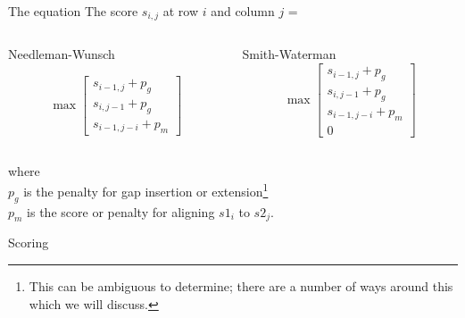 \documentclass[pdf]{beamer}
\begin{document}
  


\begin{frame}[fragile]{The equation}
  The score $s_{i,j}$ at row $i$ and column $j$ =

  \vspace{1cm}
  \begin{columns}
    \begin{column}{0.5\textwidth}
      \small{
        Needleman-Wunsch

        $$
        \max
        \left[
          \begin{array}{l}
            s_{i-1,j} + p_g \\
            s_{i,j-1} + p_g \\
            s_{i-1,j-i} + p_m%
          \end{array}%
          \right]
        $$
        }
    \end{column}
    \begin{column}{0.5\textwidth}
      \small{
        Smith-Waterman
        $$
        \max
        \left[
          \begin{array}{l}
            s_{i-1,j} + p_g \\
            s_{i,j-1} + p_g \\
            s_{i-1,j-i} + p_m\\
            0%
          \end{array}%
          \right]
        $$

      }
    \end{column}
  \end{columns}
  \footnotesize
  where\\
  $p_g$ is the penalty for gap insertion or extension\footnote{This can
          be ambiguous to determine; there are a number of ways
          around this which we will discuss.}\\
  $p_m$ is the score or penalty for
  aligning $s1_i$ to $s2_j$.
\end{frame}


\begin{frame}[fragile]{Scoring}
  \begin{figure}[ht]
    \begin{tikzpicture}[scale=0.5]
      
    \end{tikzpicture}
  \end{figure}
\end{frame}
\end{document}
